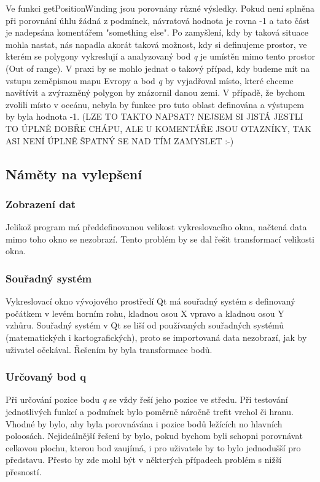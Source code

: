 \documentclass[a4paper, 12pt]{article}
\begin{document}
Ve funkci getPositionWinding jsou porovnány různé výsledky. Pokud není splněna při porovnání úhlu žádná z podmínek, návratová hodnota je rovna -1 a tato část je nadepsána komentářem "something else". Po zamyšlení, kdy by taková situace mohla nastat, nás napadla akorát taková možnost, kdy si definujeme prostor, ve kterém se polygony vykreslují a analyzovaný bod \textit{q} je umístěn mimo tento prostor (Out of range). V praxi by se mohlo jednat o takový případ, kdy budeme mít na vstupu zeměpisnou mapu Evropy a bod \textit{q} by vyjadřoval místo, které chceme navštívit a zvýrazněný polygon by znázornil danou zemi. V případě, že bychom zvolili místo v oceánu, nebyla by funkce pro tuto oblast definována a výstupem by byla hodnota -1. (LZE TO TAKTO NAPSAT? NEJSEM SI JISTÁ JESTLI TO ÚPLNĚ DOBŘE CHÁPU, ALE U KOMENTÁŘE JSOU OTAZNÍKY, TAK ASI NENÍ ÚPLNĚ ŠPATNÝ SE NAD TÍM ZAMYSLET :-)


\subsection{Náměty na vylepšení}
\subsubsection{Zobrazení dat}
Jelikož program má předdefinovanou velikost vykreslovacího okna, načtená data mimo toho okno se nezobrazí. Tento problém by se dal řešit transformací velikosti okna.

\subsubsection{Souřadný systém}
Vykreslovací okno vývojového prostředí Qt má souřadný systém s definovaný počátkem v levém horním rohu,  kladnou osou X vpravo a kladnou osou Y vzhůru. Souřadný systém v Qt se liší od používaných souřadných systémů (matematických i kartografických), proto se importovaná data nezobrazí, jak by uživatel očekával. Řešením by byla transformace bodů.

\subsubsection{Určovaný bod q}
Při určování pozice bodu \textit{q} se vždy řeší jeho pozice ve středu. Při testování jednotlivých funkcí a podmínek bylo poměrně náročně trefit vrchol či hranu. Vhodné by bylo, aby byla porovnávána i pozice bodů ležících no hlavních poloosách. Nejideálnější řešení by bylo, pokud bychom byli schopni porovnávat celkovou plochu, kterou bod zaujímá, i pro uživatele by to bylo jednodušší pro představu. Přesto by zde mohl být v některých případech problém s nižší přesností.
\end{document}

